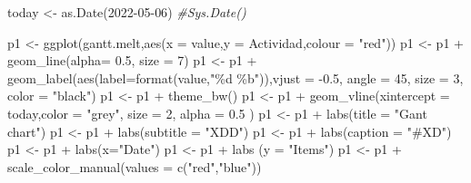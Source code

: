 \documentclass[
]{article}
\newenvironment{Shaded}{\begin{snugshade}}{\end{snugshade}}
\newcommand{\AttributeTok}[1]{\textcolor[rgb]{0.77,0.63,0.00}{#1}}
\newcommand{\CommentTok}[1]{\textcolor[rgb]{0.56,0.35,0.01}{\textit{#1}}}
\newcommand{\DecValTok}[1]{\textcolor[rgb]{0.00,0.00,0.81}{#1}}
\newcommand{\FloatTok}[1]{\textcolor[rgb]{0.00,0.00,0.81}{#1}}
\newcommand{\FunctionTok}[1]{\textcolor[rgb]{0.00,0.00,0.00}{#1}}
\newcommand{\NormalTok}[1]{#1}
\newcommand{\OtherTok}[1]{\textcolor[rgb]{0.56,0.35,0.01}{#1}}
\newcommand{\SpecialCharTok}[1]{\textcolor[rgb]{0.00,0.00,0.00}{#1}}
\newcommand{\StringTok}[1]{\textcolor[rgb]{0.31,0.60,0.02}{#1}}
\begin{document}
\begin{Shaded}
\begin{Highlighting}[]
\NormalTok{today }\OtherTok{\textless{}{-}} \FunctionTok{as.Date}\NormalTok{(}\StringTok{\textquotesingle{}2022{-}05{-}06\textquotesingle{}}\NormalTok{)}
\CommentTok{\#Sys.Date()}

\NormalTok{p1 }\OtherTok{\textless{}{-}} \FunctionTok{ggplot}\NormalTok{(gantt.melt,}\FunctionTok{aes}\NormalTok{(}\AttributeTok{x =}\NormalTok{ value,}\AttributeTok{y =}\NormalTok{ Actividad,}\AttributeTok{colour =} \StringTok{"red"}\NormalTok{))}
\NormalTok{p1 }\OtherTok{\textless{}{-}}\NormalTok{ p1 }\SpecialCharTok{+} \FunctionTok{geom\_line}\NormalTok{(}\AttributeTok{alpha=} \FloatTok{0.5}\NormalTok{, }\AttributeTok{size =} \DecValTok{7}\NormalTok{)}
\NormalTok{p1 }\OtherTok{\textless{}{-}}\NormalTok{ p1 }\SpecialCharTok{+} \FunctionTok{geom\_label}\NormalTok{(}\FunctionTok{aes}\NormalTok{(}\AttributeTok{label=}\FunctionTok{format}\NormalTok{(value,}\StringTok{"\%d \%b"}\NormalTok{)),}\AttributeTok{vjust =} \SpecialCharTok{{-}}\FloatTok{0.5}\NormalTok{, }\AttributeTok{angle =} \DecValTok{45}\NormalTok{, }\AttributeTok{size =} \DecValTok{3}\NormalTok{, }\AttributeTok{color =} \StringTok{"black"}\NormalTok{)}
\NormalTok{p1 }\OtherTok{\textless{}{-}}\NormalTok{ p1 }\SpecialCharTok{+} \FunctionTok{theme\_bw}\NormalTok{()}
\NormalTok{p1 }\OtherTok{\textless{}{-}}\NormalTok{ p1 }\SpecialCharTok{+} \FunctionTok{geom\_vline}\NormalTok{(}\AttributeTok{xintercept =}\NormalTok{ today,}\AttributeTok{color =} \StringTok{"grey"}\NormalTok{, }\AttributeTok{size =} \DecValTok{2}\NormalTok{, }\AttributeTok{alpha =} \FloatTok{0.5}\NormalTok{ )}
\NormalTok{p1 }\OtherTok{\textless{}{-}}\NormalTok{ p1 }\SpecialCharTok{+} \FunctionTok{labs}\NormalTok{(}\AttributeTok{title =} \StringTok{"Gant chart"}\NormalTok{)}
\NormalTok{p1 }\OtherTok{\textless{}{-}}\NormalTok{ p1 }\SpecialCharTok{+} \FunctionTok{labs}\NormalTok{(}\AttributeTok{subtitle =} \StringTok{"XDD"}\NormalTok{)}
\NormalTok{p1 }\OtherTok{\textless{}{-}}\NormalTok{ p1 }\SpecialCharTok{+} \FunctionTok{labs}\NormalTok{(}\AttributeTok{caption =} \StringTok{"\#XD"}\NormalTok{)}
\NormalTok{p1 }\OtherTok{\textless{}{-}}\NormalTok{ p1 }\SpecialCharTok{+} \FunctionTok{labs}\NormalTok{(}\AttributeTok{x=}\StringTok{"Date"}\NormalTok{)}
\NormalTok{p1 }\OtherTok{\textless{}{-}}\NormalTok{ p1 }\SpecialCharTok{+}  \FunctionTok{labs}\NormalTok{ (}\AttributeTok{y =} \StringTok{"Items"}\NormalTok{)}
\NormalTok{p1 }\OtherTok{\textless{}{-}}\NormalTok{ p1 }\SpecialCharTok{+}  \FunctionTok{scale\_color\_manual}\NormalTok{(}\AttributeTok{values =} \FunctionTok{c}\NormalTok{(}\StringTok{"red"}\NormalTok{,}\StringTok{"blue"}\NormalTok{))}

\end{Highlighting}
\end{Shaded}
\end{document}
